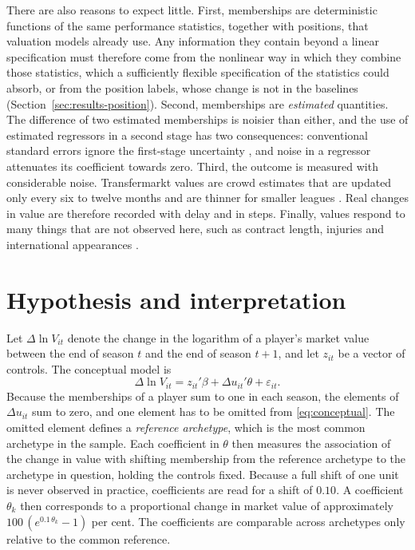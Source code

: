 There are also reasons to expect little. First, memberships are deterministic functions of the same performance statistics, together with positions, that valuation models already use. Any information they contain beyond a linear specification must therefore come from the nonlinear way in which they combine those statistics, which a sufficiently flexible specification of the statistics could absorb, or from the position labels, whose change is not in the baselines (Section~\ref{sec:results-position}). Second, memberships are \emph{estimated} quantities. The difference of two estimated memberships is noisier than either, and the use of estimated regressors in a second stage has two consequences: conventional standard errors ignore the first-stage uncertainty \cite{pagan1984econometric}, and noise in a regressor attenuates its coefficient towards zero. Third, the outcome is measured with considerable noise. Transfermarkt values are crowd estimates that are updated only every six to twelve months and are thinner for smaller leagues \cite{muller2017beyond}. Real changes in value are therefore recorded with delay and in steps. Finally, values respond to many things that are not observed here, such as contract length, injuries and international appearances \cite{franceschi2024determinants,poli2024statistical}.

\section{Hypothesis and interpretation}
\label{sec:theory-hypothesis}

Let $\Delta\ln V_{it}$ denote the change in the logarithm of a player's market value between the end of season $t$ and the end of season $t+1$, and let $z_{it}$ be a vector of controls. The conceptual model is
\begin{equation}
	\Delta\ln V_{it} = z_{it}'\beta + \Delta u_{it}'\theta + \varepsilon_{it}.
	\label{eq:conceptual}
\end{equation}
Because the memberships of a player sum to one in each season, the elements of $\Delta u_{it}$ sum to zero, and one element has to be omitted from \eqref{eq:conceptual}. The omitted element defines a \emph{reference archetype}, which is the most common archetype in the sample. Each coefficient in $\theta$ then measures the association of the change in value with shifting membership from the reference archetype to the archetype in question, holding the controls fixed. Because a full shift of one unit is never observed in practice, coefficients are read for a shift of $0.10$. A coefficient $\theta_k$ then corresponds to a proportional change in market value of approximately $100\,(e^{0.1\,\theta_k}-1)$ per cent. The coefficients are comparable across archetypes only relative to the common reference.

